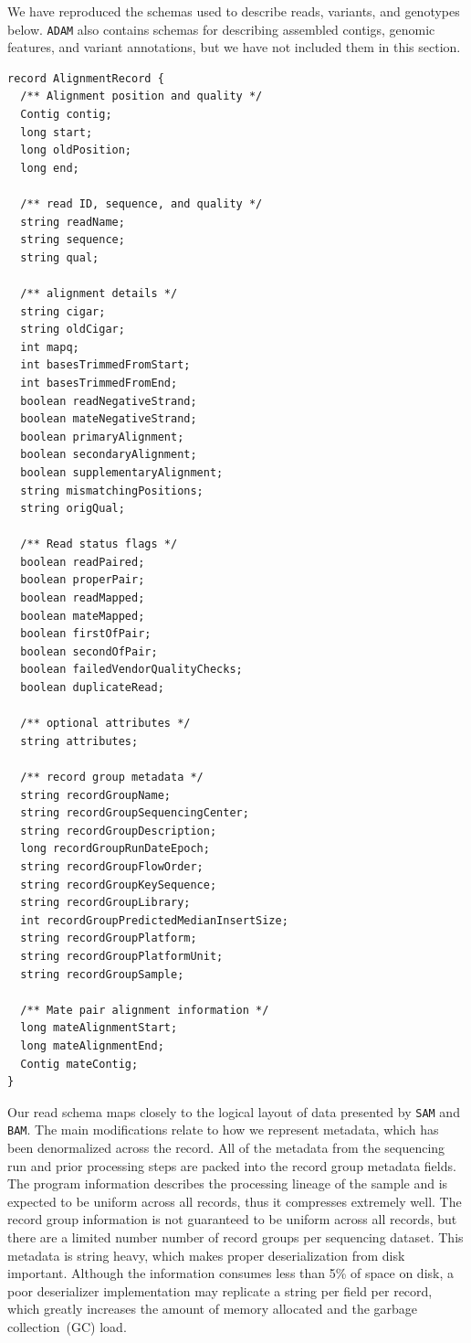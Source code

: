 \documentclass[masters]{ucbthesis}
\begin{document}
We have reproduced the schemas used to describe reads, variants, and genotypes below. \texttt{ADAM} also
contains schemas for describing assembled contigs, genomic features, and variant annotations, but we have
not included them in this section.

\begin{lstlisting}[caption=\texttt{ADAM} read schema]
record AlignmentRecord {
  /** Alignment position and quality */
  Contig contig;
  long start;
  long oldPosition;
  long end;

  /** read ID, sequence, and quality */
  string readName;
  string sequence;
  string qual;
  
  /** alignment details */
  string cigar;
  string oldCigar;
  int mapq;
  int basesTrimmedFromStart;
  int basesTrimmedFromEnd;
  boolean readNegativeStrand;
  boolean mateNegativeStrand;
  boolean primaryAlignment;
  boolean secondaryAlignment;
  boolean supplementaryAlignment;
  string mismatchingPositions;
  string origQual;

  /** Read status flags */
  boolean readPaired;
  boolean properPair;
  boolean readMapped;
  boolean mateMapped;
  boolean firstOfPair;
  boolean secondOfPair;
  boolean failedVendorQualityChecks;
  boolean duplicateRead;

  /** optional attributes */
  string attributes;

  /** record group metadata */
  string recordGroupName;
  string recordGroupSequencingCenter;
  string recordGroupDescription;
  long recordGroupRunDateEpoch;
  string recordGroupFlowOrder;
  string recordGroupKeySequence;
  string recordGroupLibrary;
  int recordGroupPredictedMedianInsertSize;
  string recordGroupPlatform;
  string recordGroupPlatformUnit;
  string recordGroupSample;

  /** Mate pair alignment information */
  long mateAlignmentStart;
  long mateAlignmentEnd;
  Contig mateContig;
}
\end{lstlisting}

Our read schema maps closely to the logical layout of data presented by \texttt{SAM} and \texttt{BAM}.
The main modifications relate to how we represent metadata, which has been denormalized across the record.
All of the metadata from the sequencing run and prior processing steps are packed into the record
group metadata fields. The program information describes the processing lineage of the sample and
is expected to be uniform across all records, thus it compresses extremely well. The record group
information is not guaranteed to be uniform across all records, but there are a limited number number
of record groups per sequencing dataset. This
metadata is string heavy, which makes proper deserialization from disk important. Although the
information consumes less than 5\% of space on disk, a poor deserializer implementation may replicate
a string per field per record, which greatly increases the amount of memory allocated and the garbage
collection~(GC) load.
\end{document}
